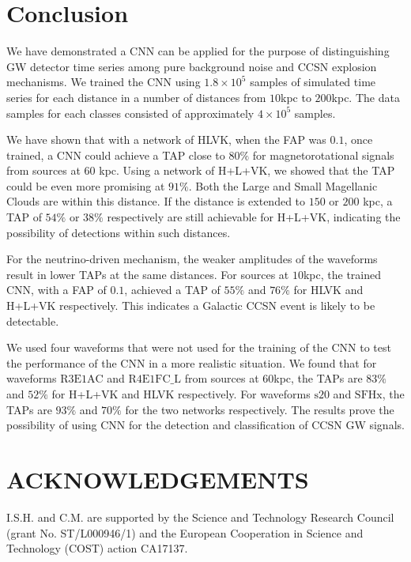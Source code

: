 \documentclass[aps,twocolumn,showpacs,groupedaddress, nofootinbib]{revtex4}  %
\begin{document}
\section{Conclusion}\label{sec:conclusion}
We have demonstrated a \ac{CNN} can be applied for the purpose of distinguishing \ac{GW} detector time series 
among pure background noise and \ac{CCSN} explosion mechanisms. 
We trained the \ac{CNN} using $1.8\times10^{5}$ samples of simulated time series for each distance in a number of distances from $10$kpc to $200$kpc.
The data samples for each classes consisted of approximately $4\times10^5$ samples. 

We have shown that with a network of HLVK, when the \ac{FAP} was $0.1$, once trained, a \ac{CNN} could achieve a \ac{TAP} close to $80\%$
for magnetorotational signals from sources at $60$ kpc. 
Using a network of H+L+VK, we showed that the \ac{TAP} could be even more promising at $91\%$. Both the Large and Small Magellanic Clouds are within this distance.
If the distance is extended to $150$ or $200$ kpc, a \ac{TAP} of $54\%$ or $38\%$ 
respectively are still achievable for H+L+VK, indicating the possibility of detections within such distances. 

For the neutrino-driven mechanism, the weaker amplitudes of the waveforms result in lower \acp{TAP} at the same distances.
For sources at $10$kpc, the trained \ac{CNN}, with a \ac{FAP} of $0.1$, achieved a \ac{TAP} of $55\%$ and $76\%$ for HLVK and H+L+VK respectively.
This indicates a Galactic \ac{CCSN} event is likely to be detectable.

We used four waveforms that were not used for the training of the \ac{CNN} to test the performance of the \ac{CNN} in a more realistic situation.
We found that for waveforms $\text{R3E1AC}$ and $\text{R4E1FC\_L}$ from sources at $60$kpc, the \acp{TAP} are $83\%$ and $52\%$ for H+L+VK and HLVK respectively.
For waveforms $\text{s}20$ and $\text{SFHx}$, the \acp{TAP} are $93\%$ and $70\%$ for the two networks respectively.
The results prove the possibility of using \ac{CNN} for the detection and classification of \ac{CCSN} \ac{GW} signals.
\\
\section*{ACKNOWLEDGEMENTS}
I.S.H. and C.M. are supported by
the Science and Technology Research Council (grant No.
ST/L000946/1) and the European Cooperation in
Science and Technology (COST) action CA17137. 

\end{document}
